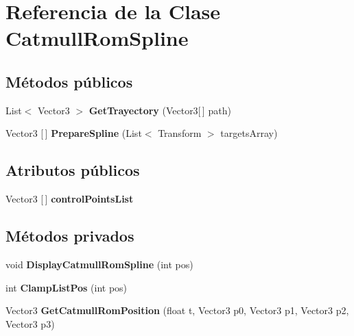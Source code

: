 \hypertarget{class_catmull_rom_spline}{}\section{Referencia de la Clase Catmull\+Rom\+Spline}
\label{class_catmull_rom_spline}
\subsection*{Métodos públicos}
\begin{DoxyCompactItemize}
\item 
\mbox{\label{class_catmull_rom_spline_a3d1f936cf80fb6177e2fb598c8cd6adf}} 
List$<$ Vector3 $>$ {\bfseries Get\+Trayectory} (Vector3\mbox{[}$\,$\mbox{]} path)
\item 
\mbox{\label{class_catmull_rom_spline_a99e5a690f95ef08186b9b785baf13a50}} 
Vector3 \mbox{[}$\,$\mbox{]} {\bfseries Prepare\+Spline} (List$<$ Transform $>$ targets\+Array)
\end{DoxyCompactItemize}
\subsection*{Atributos públicos}
\begin{DoxyCompactItemize}
\item 
\mbox{\label{class_catmull_rom_spline_a849ca4b6ac6f852a463a800430daf777}} 
Vector3 \mbox{[}$\,$\mbox{]} {\bfseries control\+Points\+List}
\end{DoxyCompactItemize}
\subsection*{Métodos privados}
\begin{DoxyCompactItemize}
\item 
\mbox{\label{class_catmull_rom_spline_abe8988bd86cfe65cb4cc893f534dd168}} 
void {\bfseries Display\+Catmull\+Rom\+Spline} (int pos)
\item 
\mbox{\label{class_catmull_rom_spline_a3ba7de330679168566750a9dfdc42534}} 
int {\bfseries Clamp\+List\+Pos} (int pos)
\item 
\mbox{\label{class_catmull_rom_spline_ad15822896d9310c20eba4b395220411c}} 
Vector3 {\bfseries Get\+Catmull\+Rom\+Position} (float t, Vector3 p0, Vector3 p1, Vector3 p2, Vector3 p3)
\end{DoxyCompactItemize}
